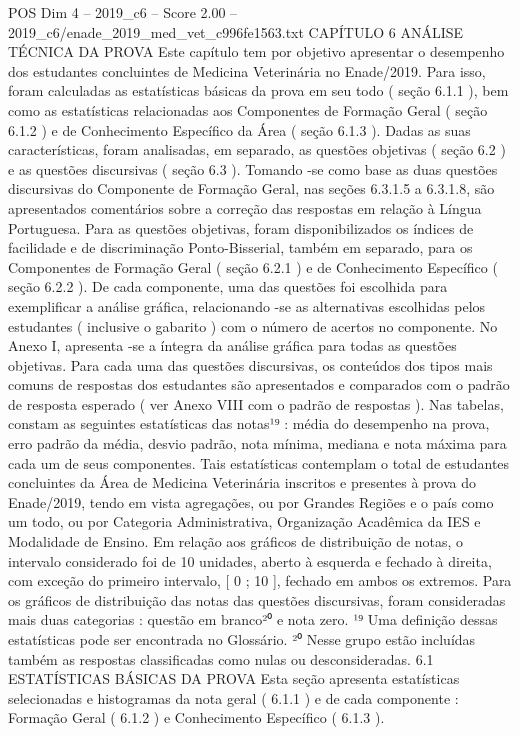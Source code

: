 \begin{textsample}{POS Dim 4 – 2019\_c6 – Score 2.00 – 2019\_c6/enade\_2019\_med\_vet\_c996fe1563.txt}  \label{ex:f4_pos_100}
CAPÍTULO 6 ANÁLISE TÉCNICA DA PROVA Este capítulo tem por objetivo apresentar o desempenho dos estudantes concluintes de Medicina Veterinária no Enade/2019.
Para isso, foram calculadas as estatísticas básicas da prova em seu todo ( seção 6.1.1 ), bem como as estatísticas relacionadas aos Componentes de Formação Geral ( seção 6.1.2 ) e de Conhecimento Específico da Área ( seção 6.1.3 ).
Dadas as suas características, foram analisadas, em separado, as questões objetivas ( seção 6.2 ) e as questões discursivas ( seção 6.3 ).
Tomando -se como base as duas questões discursivas do Componente de Formação Geral, nas seções 6.3.1.5 a 6.3.1.8, são apresentados comentários sobre a correção das respostas em relação à Língua Portuguesa.
Para as questões objetivas, foram disponibilizados os índices de facilidade e de discriminação Ponto-Bisserial, também em separado, para os Componentes de Formação Geral ( seção 6.2.1 ) e de Conhecimento Específico ( seção 6.2.2 ).
De cada componente, uma das questões foi escolhida para exemplificar a análise gráfica, relacionando -se as alternativas escolhidas pelos estudantes ( inclusive o gabarito ) com o número de acertos no componente.
No Anexo I, apresenta -se a íntegra da análise gráfica para todas as questões objetivas.
Para cada uma das questões discursivas, os conteúdos dos tipos mais comuns de respostas dos estudantes são apresentados e comparados com o padrão de resposta esperado ( ver Anexo VIII com o padrão de respostas ).
Nas tabelas, constam as seguintes estatísticas das notas¹⁹ : média do desempenho na prova, erro padrão da média, desvio padrão, nota mínima, mediana e nota máxima para cada um de seus componentes.
Tais estatísticas contemplam o total de estudantes concluintes da Área de Medicina Veterinária inscritos e presentes à prova do Enade/2019, tendo em vista agregações, ou por Grandes Regiões e o país como um todo, ou por Categoria Administrativa, Organização Acadêmica da IES e Modalidade de Ensino.
Em relação aos gráficos de distribuição de notas, o intervalo considerado foi de 10 unidades, aberto à esquerda e fechado à direita, com exceção do primeiro intervalo, [ 0 ; 10 ], fechado em ambos os extremos.
Para os gráficos de distribuição das notas das questões discursivas, foram consideradas mais duas categorias : questão em branco²⁰ e nota zero. ¹⁹ Uma definição dessas estatísticas pode ser encontrada no Glossário. ²⁰ Nesse grupo estão incluídas também as respostas classificadas como nulas ou desconsideradas. 6.1 ESTATÍSTICAS BÁSICAS DA PROVA Esta seção apresenta estatísticas selecionadas e histogramas da nota geral ( 6.1.1 ) e de cada componente : Formação Geral ( 6.1.2 ) e Conhecimento Específico ( 6.1.3 ).

\end{textsample}
